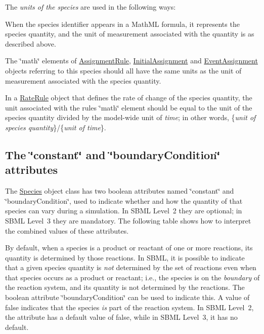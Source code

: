 The {\itshape units of the species} are used in the following ways\+: 
\begin{DoxyItemize}
\item When the species\textquotesingle{} identifier appears in a Math\+ML formula, it represents the species\textquotesingle{} quantity, and the unit of measurement associated with the quantity is as described above.


\item The \char`\"{}math\char`\"{} elements of \hyperlink{class_assignment_rule}{Assignment\+Rule}, \hyperlink{class_initial_assignment}{Initial\+Assignment} and \hyperlink{class_event_assignment}{Event\+Assignment} objects referring to this species should all have the same units as the unit of measurement associated with the species quantity.


\item In a \hyperlink{class_rate_rule}{Rate\+Rule} object that defines the rate of change of the species\textquotesingle{} quantity, the unit associated with the rule\textquotesingle{}s \char`\"{}math\char`\"{} element should be equal to the unit of the species\textquotesingle{} quantity divided by the model-\/wide unit of {\itshape time}; in other words, \{{\itshape unit of species quantity}\}/\{{\itshape unit of time}\}.


\end{DoxyItemize}\hypertarget{class_species_species-constant}{}\subsection{The \char`\"{}constant\char`\"{} and \char`\"{}boundary\+Condition\char`\"{} attributes}\label{class_species_species-constant}
The \hyperlink{class_species}{Species} object class has two boolean attributes named \char`\"{}constant\char`\"{} and \char`\"{}boundary\+Condition\char`\"{}, used to indicate whether and how the quantity of that species can vary during a simulation. In S\+B\+ML Level~2 they are optional; in S\+B\+ML Level~3 they are mandatory. The following table shows how to interpret the combined values of these attributes.



By default, when a species is a product or reactant of one or more reactions, its quantity is determined by those reactions. In S\+B\+ML, it is possible to indicate that a given species\textquotesingle{} quantity is {\itshape not} determined by the set of reactions even when that species occurs as a product or reactant; i.\+e., the species is on the {\itshape boundary} of the reaction system, and its quantity is not determined by the reactions. The boolean attribute \char`\"{}boundary\+Condition\char`\"{} can be used to indicate this. A value of {\ttfamily false} indicates that the species {\itshape is} part of the reaction system. In S\+B\+ML Level~2, the attribute has a default value of {\ttfamily false}, while in S\+B\+ML Level~3, it has no default.

